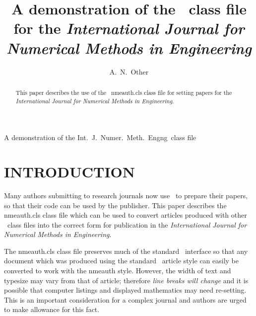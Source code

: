 \documentclass{nmeauth}
\begin{document}

{A demonstration of the Int.\ J.\ Numer.\ Meth.\ Engng\ class file}

\title{A demonstration of the \LaTeXe\ class file for the
\itshape{International Journal for Numerical Methods in Engineering}\footnotemark[2]}

\author{A.~N.~Other\corrauth}

\address{Journals Production Department,
John Wiley \& Sons, Ltd, The Atrium, Southern Gate, Chichester,\\
West Sussex, PO19~8SQ, U.K.}





\noaccepted{}

\begin{abstract}
This paper describes the use of the \LaTeXe\ \textsf{nmeauth.cls} class file
for setting papers for the \emph{International Journal for Numerical Methods in Engineering}.
\end{abstract}


\section{INTRODUCTION}
Many authors submitting to research journals now use \LaTeXe\ to prepare
their papers, so that their code can be used by the publisher.
This paper describes the \textsf{nmeauth.cls} class file
which can be used to convert articles produced with other \LaTeXe\ class files
into the correct form for publication
in the \emph{International Journal for Numerical Methods in Engineering}.

The \textsf{nmeauth.cls} class file preserves much of the standard
\LaTeXe\ interface so that any document which was produced using
the standard \LaTeXe\ \textsf{article} style can easily be converted
to work with the \textsf{nmeauth} style.
However, the width of text and typesize
may vary from that of \textsf{article}; therefore
\emph{line breaks will change} and it is possible
that computer listings and displayed mathematics may need re-setting.
This is an important consideration for a complex journal
and authors are urged to make allowance for this fact.
\end{document}
